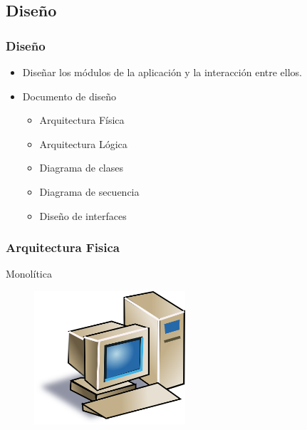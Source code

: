 \documentclass[9pt]{beamer}
\begin{document}
    \subsection{Diseño}
    \begin{frame}
        \frametitle{Diseño}                 
                
        \begin{itemize}
            \item Diseñar los módulos de la aplicación y la interacción entre ellos.
            \item Documento de diseño
            
            \begin{itemize}
                \item Arquitectura Física
                \item Arquitectura Lógica
                \item Diagrama de clases
                \item Diagrama de secuencia
                \item Diseño de interfaces
            \end{itemize}
        \end{itemize}

    \end{frame}

    \begin{frame}
        \frametitle{Arquitectura Fisica}                       
        Monolítica
        \begin{figure}
            \includegraphics[width=0.5\textwidth]{assets/ArquitecturaFisica.png}
        \end{figure}

    \end{frame}
\end{document}
